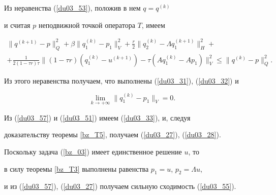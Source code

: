 \begin{pf}


Из неравенства (\ref{du03_53}), положив в нем $q=q^{(k)}$


и считая $p$ неподвижной точкой оператора $T$, имеем


\begin{multline*}


 \| {q^{(k+1)}-p} \|_Q^2+\beta \| q_1^{(k)}-p_1 \|_V^2+


\frac {r} {2} \| q_2^{(k)}-\Lambda q_1^{(k+1)} \|_H^2+ \\


%


+\frac {1}{2 (1-\tau r) \tau} \| (1-\tau r) (q_1^{(k)} -u^{(k+1)})


- \tau (A q_1^{(k)}- A p_1) \|_V^2


\leq \| {q^{(k)}-p} \|_Q^2 .


\end{multline*}


Из этого неравенства получаем, что выполнены (\ref{du03_31}), (\ref{du03_32}) и


\begin{equation}


\lim_{k \to+\infty} \| q_1^{(k)}-p_1 \|_V =0.


\label{du03_57}


\end{equation}


Из (\ref{du03_57}) и (\ref{du03_51}) имеем (\ref{du03_33}), и, следуя 


доказательству теоремы \ref{bz_T5}, получаем (\ref{du03_27}), (\ref{du03_28}). 


Поскольку задача (\ref{bz_03}) имеет единственное решение $u$, то 


в силу теоремы \ref{bz_T3} выполнены равенства $ p_1= u$, $ p_2=\Lambda u$,


и из (\ref{du03_57}), (\ref{du03_27}) получаем сильную сходимость (\ref{du03_55}).


\end{pf}











